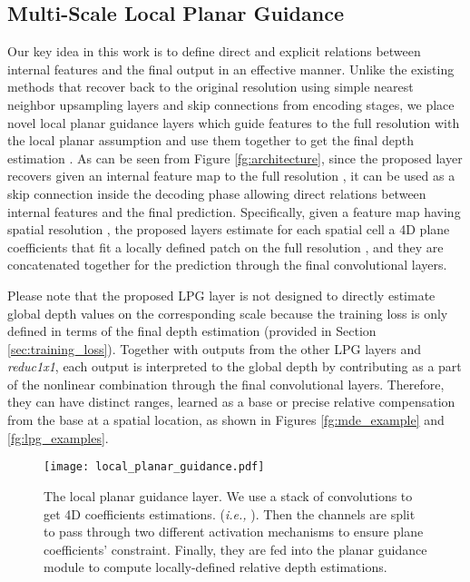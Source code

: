 \documentclass[10pt,twocolumn,letterpaper]{article}
\begin{document}
\subsection{Multi-Scale Local Planar Guidance}
Our key idea in this work is to define direct and explicit relations between internal features and the final output in an effective manner.
Unlike the existing methods that recover back to the original resolution using simple nearest neighbor upsampling layers and skip connections from encoding stages, we place novel local planar guidance layers which guide features to the full resolution with the local planar assumption and use them together to get the final depth estimation .
As can be seen from Figure \ref{fg:architecture}, since the proposed layer recovers given an internal feature map to the full resolution , it can be used as a skip connection inside the decoding phase allowing direct relations between internal features and the final prediction.
Specifically, given a feature map having spatial resolution , the proposed layers estimate for each spatial cell a 4D plane coefficients that fit a locally defined  patch on the full resolution , and they are concatenated together for the prediction through the final convolutional layers.

Please note that the proposed LPG layer is not designed to directly estimate global depth values on the corresponding scale because the training loss is only defined in terms of the final depth estimation (provided in Section \ref{sec:training_loss}).
Together with outputs from the other LPG layers and \textit{reduc1x1}, each output is interpreted to the global depth by contributing as a part of the nonlinear combination through the final convolutional layers.
Therefore, they can have distinct ranges, learned as a base or precise relative compensation from the base at a spatial location, as shown in Figures \ref{fg:mde_example} and \ref{fg:lpg_examples}.

\begin{figure}[t]
	\centering
	\footnotesize
	\texttt{[image: local\_planar\_guidance.pdf]}
	\caption{The local planar guidance layer. We use a stack of  convolutions to get 4D coefficients estimations. (\textit{i.e.,} ). Then the channels are split to pass through two different activation mechanisms to ensure plane coefficients' constraint. Finally, they are fed into the planar guidance module to compute locally-defined relative depth estimations.}
	\label{fg:local_planar_guidance}
\end{figure}
\end{document}

